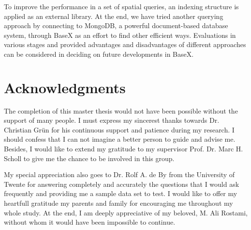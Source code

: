 \documentclass[a4paper,12pt]{article}
\begin{document}
To improve the performance in a set of spatial queries, an indexing structure is applied as an external library.
At the end, we have tried another querying approach by connecting to MongoDB, a powerful document-based database system, through BaseX as an effort to find other efficient ways.
Evaluations in various stages and provided advantages and disadvantages of different approaches can be considered in deciding on future developments in BaseX.
\thispagestyle{empty}

\newpage
\section*{Acknowledgments}
\thispagestyle{empty}

The completion of this master thesis would not have been possible 
without the support of many people. 
I must express my sincerest thanks towards 
Dr. Christian Gr{\"u}n for his continuous support and patience during my research.
I should confess that I can not imagine a better person to guide and advise me. Besides, I would like to extend my gratitude to my supervisor Prof. Dr. Marc H. Scholl to give me the chance to be involved in this group.

My special appreciation also goes to Dr. Rolf A. de By from the University of Twente for
answering completely and accurately the questions that I would ask
frequently and providing me a sample data set to test. I would like to offer my heartfull gratitude my parents and family for encouraging me 
throughout my whole study. At the end, I am deeply appreciative of my beloved, M. Ali Rostami, without whom it would have been impossible to continue.


\newpage
\tableofcontents

\thispagestyle{empty}
\newpage
\end{document}

